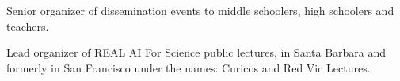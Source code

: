 Senior organizer of dissemination events to middle schoolers, high schoolers and teachers.

Lead organizer of REAL AI For Science public lectures, in Santa Barbara and formerly in San Francisco under the names: Curicos and Red Vic Lectures.